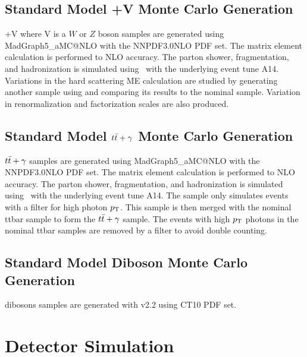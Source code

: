 \subsection{Standard Model \ttbar+V Monte Carlo Generation}

\indent \ttbar+V where V is a $W$ or $Z$ boson samples are generated using {\sc MadGraph5\_aMC\/@NLO} with the NNPDF3.0NLO PDF set. The matrix element calculation is performed to NLO accuracy. The parton shower, fragmentation, and hadronization is simulated using \pythiaeight\ with the underlying event tune A14.  Variations in the hard scattering ME calculation are studied by generating another sample using \sherpa and comparing its results to the nominal sample.  Variation in renormalization and factorization scales are also produced. \\

\subsection{Standard Model $t\bar{t}+\gamma$ Monte Carlo Generation}

\indent $t\bar{t}+\gamma$ samples are generated using {\sc MadGraph5\_aMC\/@NLO} with the NNPDF3.0NLO PDF set. The matrix element calculation is performed to NLO accuracy. The parton shower, fragmentation, and hadronization is simulated using \pythiaeight\ with the underlying event tune A14.  The sample only simulates events with a filter for high photon $p_{\mathrm{T}}$.  This sample is then merged with the nominal ttbar sample to form the $t\bar{t}+\gamma$ sample.  The events with high $p_{\mathrm{T}}$ photons in the nominal ttbar samples are removed by a filter to avoid double counting. \\

\subsection{Standard Model Diboson Monte Carlo Generation}

\indent dibosons samples are generated with \sherpa v2.2 using CT10 PDF set. 

\section{Detector Simulation}
\label{sec:MC:DET}

